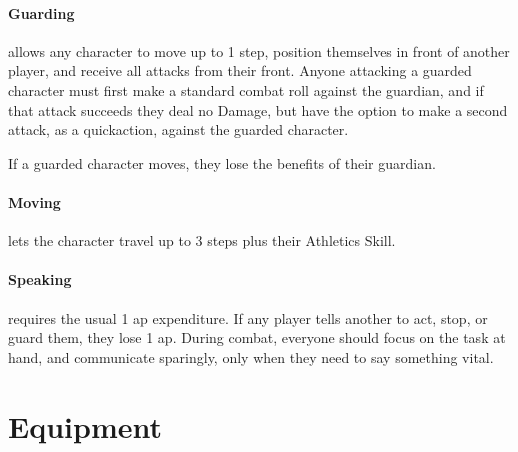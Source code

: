 \begin{multicols}{2}
\paragraph{Guarding}
\label{guarding}
allows any character to move up to 1 \gls{step}, position themselves in front of another player, and receive all attacks from their front.
Anyone attacking a guarded character must first make a standard combat roll against the guardian, and if that attack succeeds they deal no Damage, but have the option to make a second attack, as a \gls{quickaction}, against the guarded character.

If a guarded character moves, they lose the benefits of their guardian.

\paragraph{Moving}
\label{moving}
lets the character travel up to 3 steps plus their Athletics Skill.

\paragraph{Speaking}
requires the usual 1 \gls{ap} expenditure.
If any player tells another to act, stop, or guard them, they lose 1 \gls{ap}.
During combat, everyone should focus on the task at hand, and communicate sparingly, only when they need to say something vital.

\end{multicols}

\section{Equipment}

